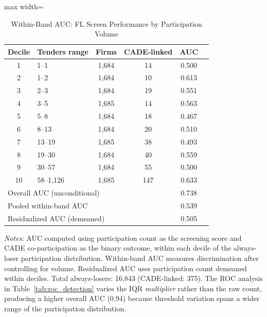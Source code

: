 \begin{table}[htbp]
\centering
\caption{Within-Band AUC: FL Screen Performance by Participation Volume}
\label{tab:within_band_auc}
\begin{adjustbox}{max width=\textwidth}
\begin{threeparttable}
\small
\begin{tabular}{clcccc}
\toprule
Decile & Tenders range & Firms & CADE-linked & AUC \\
\midrule
1 & 1--1 & 1,684 & 14 & 0.500 \\
2 & 1--2 & 1,684 & 10 & 0.613 \\
3 & 2--3 & 1,684 & 19 & 0.551 \\
4 & 3--5 & 1,685 & 14 & 0.563 \\
5 & 5--8 & 1,684 & 18 & 0.467 \\
6 & 8--13 & 1,684 & 20 & 0.510 \\
7 & 13--19 & 1,685 & 38 & 0.493 \\
8 & 19--30 & 1,684 & 40 & 0.559 \\
9 & 30--57 & 1,684 & 55 & 0.500 \\
10 & 58--1,126 & 1,685 & 147 & 0.633 \\
\midrule
\multicolumn{4}{l}{Overall AUC (unconditional)} & 0.738 \\
\multicolumn{4}{l}{Pooled within-band AUC} & 0.539 \\
\multicolumn{4}{l}{Residualized AUC (demeaned)} & 0.505 \\
\bottomrule
\end{tabular}
\begin{tablenotes}
\small
\item \textit{Notes:} AUC computed using participation count as the
screening score and CADE co-participation as the binary outcome,
within each decile of the always-loser participation distribution.
Within-band AUC measures discrimination after controlling for volume.
Residualized AUC uses participation count demeaned within deciles.
Total always-losers: 16,843 (CADE-linked: 375).
The ROC analysis in Table~\ref{tab:roc_detection} varies the IQR
\emph{multiplier} rather than the raw count, producing a higher
overall AUC (0.94) because threshold variation spans a wider range
of the participation distribution.
\end{tablenotes}
\end{threeparttable}
\end{adjustbox}
\end{table}
